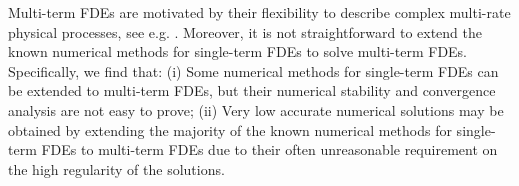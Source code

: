 \documentclass[10pt]{siamltex}
\begin{document}
Multi-term  FDEs  are motivated by their
flexibility to describe complex multi-rate physical
processes, see  e.g. \cite{Diethelm-B10,JiangLiu-etal12b,Luchko11,Pod-B99}.
Moreover, it is not  straightforward to extend the known numerical methods for single-term FDEs to solve multi-term FDEs.
Specifically, we find that:
(i) Some numerical methods
for single-term FDEs can be  extended to multi-term FDEs, but their numerical
stability and convergence analysis are not easy to prove; (ii)
Very low accurate numerical solutions may be obtained by extending the majority of the known numerical
methods for single-term FDEs to multi-term FDEs due to their often unreasonable requirement on the
high regularity of the solutions.

\end{document}
